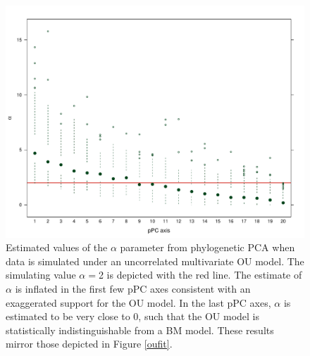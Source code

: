 \documentclass[a4paper,12pt]{article}
\begin{document}
\begin{figure}[p]
\centering
\includegraphics[scale=0.65]{fig/alpha-est.pdf}
\caption{Estimated values of the $\alpha$ parameter from phylogenetic PCA when data is simulated under an uncorrelated multivariate OU model. The simulating value $\alpha=$2 is depicted with the red line. The estimate of $\alpha$ is inflated in the first few pPC axes consistent with an exaggerated support for the OU model. In the last pPC axes, $\alpha$ is estimated to be very close to 0, such that the OU model is statistically indistinguishable from a BM model. These results mirror those depicted in Figure \ref{oufit}.}
\label{alpha}
\end{figure}
\end{document}
